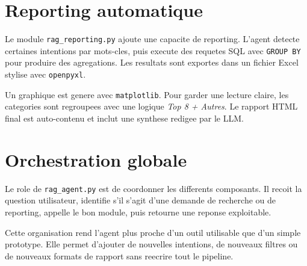 \section{Reporting automatique}

Le module \texttt{rag\_reporting.py} ajoute une capacite de reporting. L'agent detecte certaines intentions par mots-cles, puis execute des requetes SQL avec \texttt{GROUP BY} pour produire des agregations. Les resultats sont exportes dans un fichier Excel stylise avec \texttt{openpyxl}.

Un graphique est genere avec \texttt{matplotlib}. Pour garder une lecture claire, les categories sont regroupees avec une logique \textit{Top 8 + Autres}. Le rapport HTML final est auto-contenu et inclut une synthese redigee par le LLM.

\section{Orchestration globale}

Le role de \texttt{rag\_agent.py} est de coordonner les differents composants. Il recoit la question utilisateur, identifie s'il s'agit d'une demande de recherche ou de reporting, appelle le bon module, puis retourne une reponse exploitable.

Cette organisation rend l'agent plus proche d'un outil utilisable que d'un simple prototype. Elle permet d'ajouter de nouvelles intentions, de nouveaux filtres ou de nouveaux formats de rapport sans reecrire tout le pipeline.

